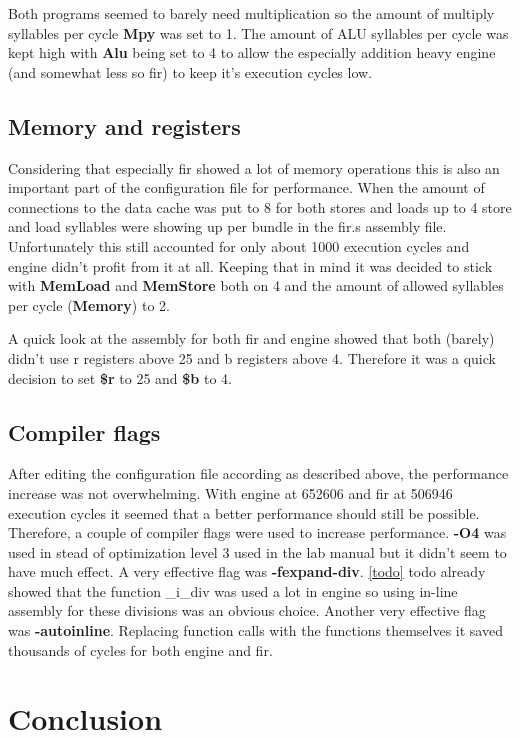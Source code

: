 Both programs seemed to barely need multiplication so the amount of multiply syllables per cycle \textbf{Mpy} was set to 1. The amount of ALU syllables per cycle was kept high with \textbf{Alu} being set to 4 to allow the especially addition heavy engine (and somewhat less so fir) to keep it's execution cycles low.

\subsection{Memory and registers}
Considering that especially fir showed a lot of memory operations this is also an important part of the configuration file for performance. When the amount of connections to the data cache was put to 8 for both stores and loads up to 4 store and load syllables were showing up per bundle in the fir.s assembly file. Unfortunately this still accounted for only about 1000 execution cycles and engine didn't profit from it at all. Keeping that in mind it was decided to stick with \textbf{MemLoad} and \textbf{MemStore} both on 4 and the amount of allowed syllables per cycle (\textbf{Memory}) to 2.

A quick look at the assembly for both fir and engine showed that both (barely) didn't use r registers above 25 and b registers above 4. Therefore it was a quick decision to set \textbf{\$r} to 25 and \textbf{\$b} to 4.

\subsection{Compiler flags}
After editing the configuration file according as described above, the performance increase was not overwhelming. With engine at 652606 and fir at 506946 execution cycles it seemed that a better performance should still be possible. Therefore, a couple of compiler flags were used to increase performance. \textbf{-O4} was used in stead of optimization level 3 used in the lab manual but it didn't seem to have much effect. A very effective flag was \textbf{-fexpand-div}. \cref{todo} todo already showed that the function \_i\_div was used a lot in engine so using in-line assembly for these divisions was an obvious choice. Another very effective flag was \textbf{-autoinline}. Replacing function calls with the functions themselves it saved thousands of cycles for both engine and fir.

\section{Conclusion}
